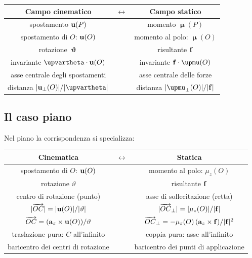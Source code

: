 \begin{center}
	\renewcommand{\arraystretch}{1.4}
	\begin{tabular}{ccc}
		\toprule
		\textbf{Campo cinematico} & $\longleftrightarrow$
		& \textbf{Campo statico} \\
		\midrule
		spostamento $\mathbf{u}(P)$
		& & momento $\bm{\upmu}(P)$ \\
		spostamento di $O$: $\mathbf{u}(O)$
		& & momento al polo: $\bm{\upmu}(O)$ \\
		rotazione $\bm{\upvartheta}$
		& & risultante $\mathbf{f}$ \\
		invariante $\bm{\upvartheta}\cdot\ub(O)$
		& & invariante $\fb\cdot\bm{\upmu}(O)$ \\
		asse centrale degli spostamenti
		& & asse centrale delle forze \\
		distanza $|\ub_\perp(O)|/|\bm{\upvartheta}|$
		& & distanza $|\bm{\upmu}_\perp(O)|/|\fb|$ \\
		\bottomrule
	\end{tabular}
\end{center}

\subsection{Il caso piano}

Nel piano la corrispondenza si specializza:

\begin{center}
	\renewcommand{\arraystretch}{1.4}
	\begin{tabular}{ccc}
		\toprule
		\textbf{Cinematica} & $\longleftrightarrow$
		& \textbf{Statica} \\
		\midrule
		spostamento di $O$: $\mathbf{u}(O)$
		& & momento al polo: $\mu_z(O)$ \\
		rotazione $\vartheta$
		& & risultante $\mathbf{f}$ \\
		centro di rotazione (punto)
		& & asse di sollecitazione (retta) \\
		$|\overrightarrow{OC}| = |\mathbf{u}(O)|/|\vartheta|$
		& & $|\overrightarrow{OC}_\perp|
		= |\mu_z(O)|/|\mathbf{f}|$ \\
		$\overrightarrow{OC}
		= (\mathbf{a}_z \times \mathbf{u}(O))/\vartheta$
		& & $\overrightarrow{OC}_\perp
		= -\mu_z(O)\,(\mathbf{a}_z \times \mathbf{f})/|\mathbf{f}|^2$ \\
		traslazione pura: $C$ all'infinito
		& & coppia pura: asse all'infinito \\
		baricentro dei centri di rotazione
		& & baricentro dei punti di applicazione \\
		\bottomrule
	\end{tabular}
\end{center}

